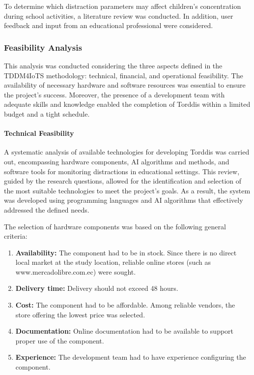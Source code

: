                 To determine which distraction parameters may affect children’s concentration during school activities, a literature review was conducted. In addition, user feedback and input from an educational professional were considered.
                
                \subsubsection{Feasibility Analysis}
                This analysis was conducted considering the three aspects defined in the TDDM4IoTS methodology: technical, financial, and operational feasibility. The availability of necessary hardware and software resources was essential to ensure the project's success. Moreover, the presence of a development team with adequate skills and knowledge enabled the completion of Torddis within a limited budget and a tight schedule.
                
                \paragraph{Technical Feasibility}
                A systematic analysis of available technologies for developing Torddis was carried out, encompassing hardware components, AI algorithms and methods, and software tools for monitoring distractions in educational settings. This review, guided by the research questions, allowed for the identification and selection of the most suitable technologies to meet the project’s goals. As a result, the system was developed using programming languages and AI algorithms that effectively addressed the defined needs.
                
                The selection of hardware components was based on the following general criteria:
                
                \begin{enumerate}
                    \item \textbf{Availability:} The component had to be in stock. Since there is no direct local market at the study location, reliable online stores (such as www.mercadolibre.com.ec) were sought.
                    
                    \item \textbf{Delivery time:} Delivery should not exceed 48 hours.
                    
                    \item \textbf{Cost:} The component had to be affordable. Among reliable vendors, the store offering the lowest price was selected.
                    
                    \item \textbf{Documentation:} Online documentation had to be available to support proper use of the component.
                    
                    \item \textbf{Experience:} The development team had to have experience configuring the component.
                \end{enumerate}
                

